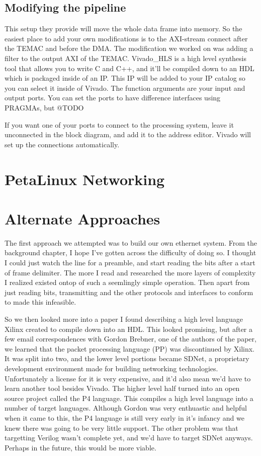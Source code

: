 \documentclass[12pt]{report}
\begin{document}
\section{Modifying the pipeline}
This setup they provide will move the whole data frame into memory. So the easiest place to add your own modifications is to the AXI-stream connect after the TEMAC and before the DMA. The modification we worked on was adding a filter to the output AXI of the TEMAC. Vivado_HLS is a high level synthesis tool that allows you to write C and C++, and it'll be compiled down to an HDL which is packaged inside of an IP. This IP will be added to your IP catalog so you can select it inside of Vivado. The function arguments are your input and output ports. You can set the ports to have difference interfaces using PRAGMAs, but @TODO

If you want one of your ports to connect to the processing system, leave it unconnected in the block diagram, and add it to the address editor. Vivado will set up the connections automatically.

\chapter{PetaLinux Networking}

\chapter{Alternate Approaches}
The first approach we attempted was to build our own ethernet system. From the background chapter, I hope I've gotten across the difficulty of doing so. I thought I could just watch the line for a preamble, and start reading the bits after a start of frame delimiter. The more I read and researched the more layers of complexity I realized existed ontop of such a seemlingly simple operation. Then apart from just reading bits, transmitting and the other protocols and interfaces to conform to made this infeasible.

So we then looked more into a paper \cite{pp} I found describing a high level language Xilinx created to compile down into an HDL. This looked promising, but after a few email correspondences with Gordon Brebner, one of the authors of the paper, we learned that the packet processing language (PP) was discontinued by Xilinx. It was split into two, and the lower level portions became SDNet, a proprietary development environment made for building networking technologies. Unfortunately a license for it is very expensive, and it'd also mean we'd have to learn another tool besides Vivado.
The higher level half turned into an open source project called the P4 language.
This compiles a high level language into a number of target languages. Although Gordon was very enthuastic and helpful when it came to this, the P4 language is still very early in it's infancy and we knew there was going to be very little support. The other problem was that targetting Verilog wasn't complete yet, and we'd have to target SDNet anyways. Perhaps in the future, this would be more viable.
\end{document}

